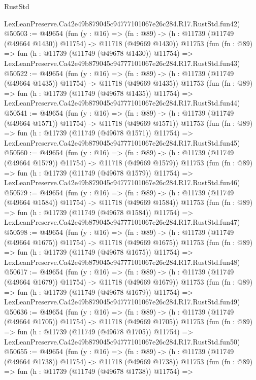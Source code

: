 \begin{lexlean}{RustStd}
\begin{coremodule}
    LexLeanPreserve.Ca42e49b879045c94777101067e26c284.R17.RustStd.fun42)
@50503 := @49654
    (fun (y : @16) =>
    (fn : @89) -> (h : @11739 (@11749 (@49664 @1430)) @11754) -> @11718 (@49669 @1430))
    @11753
    (fun (fn : @89) =>
    fun (h : @11739 (@11749 (@49678 @1430)) @11754) =>
    LexLeanPreserve.Ca42e49b879045c94777101067e26c284.R17.RustStd.fun43)
@50522 := @49654
    (fun (y : @16) =>
    (fn : @89) -> (h : @11739 (@11749 (@49664 @1435)) @11754) -> @11718 (@49669 @1435))
    @11753
    (fun (fn : @89) =>
    fun (h : @11739 (@11749 (@49678 @1435)) @11754) =>
    LexLeanPreserve.Ca42e49b879045c94777101067e26c284.R17.RustStd.fun44)
@50541 := @49654
    (fun (y : @16) =>
    (fn : @89) -> (h : @11739 (@11749 (@49664 @1571)) @11754) -> @11718 (@49669 @1571))
    @11753
    (fun (fn : @89) =>
    fun (h : @11739 (@11749 (@49678 @1571)) @11754) =>
    LexLeanPreserve.Ca42e49b879045c94777101067e26c284.R17.RustStd.fun45)
@50560 := @49654
    (fun (y : @16) =>
    (fn : @89) -> (h : @11739 (@11749 (@49664 @1579)) @11754) -> @11718 (@49669 @1579))
    @11753
    (fun (fn : @89) =>
    fun (h : @11739 (@11749 (@49678 @1579)) @11754) =>
    LexLeanPreserve.Ca42e49b879045c94777101067e26c284.R17.RustStd.fun46)
@50579 := @49654
    (fun (y : @16) =>
    (fn : @89) -> (h : @11739 (@11749 (@49664 @1584)) @11754) -> @11718 (@49669 @1584))
    @11753
    (fun (fn : @89) =>
    fun (h : @11739 (@11749 (@49678 @1584)) @11754) =>
    LexLeanPreserve.Ca42e49b879045c94777101067e26c284.R17.RustStd.fun47)
@50598 := @49654
    (fun (y : @16) =>
    (fn : @89) -> (h : @11739 (@11749 (@49664 @1675)) @11754) -> @11718 (@49669 @1675))
    @11753
    (fun (fn : @89) =>
    fun (h : @11739 (@11749 (@49678 @1675)) @11754) =>
    LexLeanPreserve.Ca42e49b879045c94777101067e26c284.R17.RustStd.fun48)
@50617 := @49654
    (fun (y : @16) =>
    (fn : @89) -> (h : @11739 (@11749 (@49664 @1679)) @11754) -> @11718 (@49669 @1679))
    @11753
    (fun (fn : @89) =>
    fun (h : @11739 (@11749 (@49678 @1679)) @11754) =>
    LexLeanPreserve.Ca42e49b879045c94777101067e26c284.R17.RustStd.fun49)
@50636 := @49654
    (fun (y : @16) =>
    (fn : @89) -> (h : @11739 (@11749 (@49664 @1705)) @11754) -> @11718 (@49669 @1705))
    @11753
    (fun (fn : @89) =>
    fun (h : @11739 (@11749 (@49678 @1705)) @11754) =>
    LexLeanPreserve.Ca42e49b879045c94777101067e26c284.R17.RustStd.fun50)
@50655 := @49654
    (fun (y : @16) =>
    (fn : @89) -> (h : @11739 (@11749 (@49664 @1738)) @11754) -> @11718 (@49669 @1738))
    @11753
    (fun (fn : @89) =>
    fun (h : @11739 (@11749 (@49678 @1738)) @11754) =>

\end{coremodule}
\end{lexlean}
